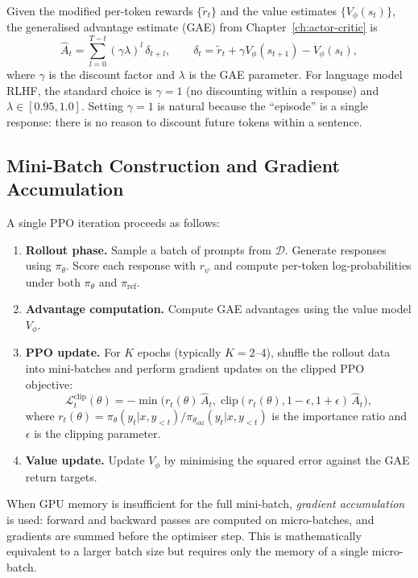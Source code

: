 Given the modified per-token rewards $\{\tilde{r}_t\}$ and the value estimates $\{V_\phi(s_t)\}$, the generalised advantage estimate (GAE) from Chapter~\ref{ch:actor-critic} is
\begin{equation}
\label{eq:gae-lm}
\hat{A}_t = \sum_{l=0}^{T-t} (\gamma\lambda)^l \,\delta_{t+l}, \qquad \delta_t = \tilde{r}_t + \gamma V_\phi(s_{t+1}) - V_\phi(s_t),
\end{equation}
where $\gamma$ is the discount factor and $\lambda$ is the GAE parameter. For language model RLHF, the standard choice is $\gamma = 1$ (no discounting within a response) and $\lambda \in [0.95, 1.0]$. Setting $\gamma = 1$ is natural because the ``episode'' is a single response: there is no reason to discount future tokens within a sentence.

\subsection{Mini-Batch Construction and Gradient Accumulation}
\label{sec:minibatch}

A single PPO iteration proceeds as follows:
\begin{enumerate}
  \item \textbf{Rollout phase.} Sample a batch of prompts from $\mathcal{D}$. Generate responses using $\pi_\theta$. Score each response with $r_\psi$ and compute per-token log-probabilities under both $\pi_\theta$ and $\pi_{\mathrm{ref}}$.
  \item \textbf{Advantage computation.} Compute GAE advantages using the value model $V_\phi$.
  \item \textbf{PPO update.} For $K$ epochs (typically $K = 2$--$4$), shuffle the rollout data into mini-batches and perform gradient updates on the clipped PPO objective:
  \begin{equation}
  \label{eq:ppo-clip-lm}
  \mathcal{L}^{\mathrm{clip}}_t(\theta) = -\min\!\bigl(r_t(\theta)\,\hat{A}_t,\; \mathrm{clip}(r_t(\theta), 1{-}\epsilon, 1{+}\epsilon)\,\hat{A}_t\bigr),
  \end{equation}
  where $r_t(\theta) = \pi_\theta(y_t|x,y_{<t}) / \pi_{\theta_{\mathrm{old}}}(y_t|x,y_{<t})$ is the importance ratio and $\epsilon$ is the clipping parameter.
  \item \textbf{Value update.} Update $V_\phi$ by minimising the squared error against the GAE return targets.
\end{enumerate}

When GPU memory is insufficient for the full mini-batch, \emph{gradient accumulation} is used: forward and backward passes are computed on micro-batches, and gradients are summed before the optimiser step. This is mathematically equivalent to a larger batch size but requires only the memory of a single micro-batch.

